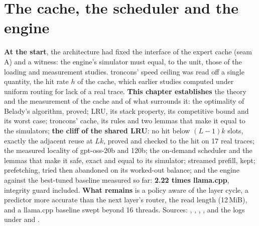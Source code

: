 \ifdefined\GrapheCchFalaise\else\fi

\chapter{The cache, the scheduler and the engine}\label{ch:t2-cache}

\begin{origine}
\textbf{At the start}, the architecture had fixed the interface of the expert cache (seam A) and a witness: the engine's simulator must equal, to the unit, those of the loading and measurement studies. troncons' speed ceiling was read off a single quantity, the hit rate $h$ of the cache, which earlier studies computed under uniform routing for lack of a real trace.
\textbf{This chapter establishes} the theory and the measurement of the cache and of what surrounds it: the optimality of Belady's algorithm, proved; LRU, its stack property, its competitive bound and its worst case; troncons' cache, its rules and two lemmas that make it equal to the simulators; \textbf{the cliff of the shared LRU}: no hit below $(L-1)k$ slots, exactly the adjacent reuse at $Lk$, proved and checked to the hit on 17 real traces; the measured locality of gpt-oss-20b and 120b; the on-demand scheduler and the lemmas that make it safe, exact and equal to its simulator; streamed prefill, kept; prefetching, tried then abandoned on its worked-out balance; and the engine against the best-tuned baseline measured so far: \textbf{2.22 times llama.cpp}, integrity guard included.
\textbf{What remains} is a policy aware of the layer cycle, a predictor more accurate than the next layer's router, the read length (12\,MiB), and a llama.cpp baseline swept beyond 16 threads.
Sources: , , , , and the logs under  and .
\end{origine}

